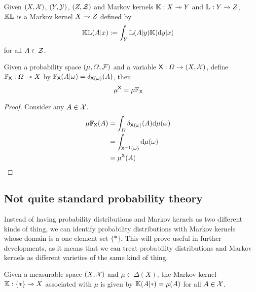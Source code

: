 \begin{definition}
Given $(X,\mathcal{X})$, $(Y,\mathcal{Y})$, $(Z,\mathcal{Z})$ and Markov kernels $\mathbb{K}:X\rightarrowtriangle Y$ and $\mathbb{L}:Y\rightarrowtriangle Z$, $\mathbb{K}\mathbb{L}$ is a Markov kernel $X\rightarrowtriangle Z$ defined by
\begin{align}
	\mathbb{K}\mathbb{L}(A|x):= \int_{Y} \mathbb{L}(A|y)\mathbb{K}(\mathrm{d}y|x)
\end{align}
for all $A\in \mathcal{Z}$.
\end{definition}

\begin{lemma}\label{lem:pushf_kprod}
Given a probability space $(\mu,\Omega,\mathcal{F})$ and a variable $\mathsf{X}:\Omega\to (X,\mathcal{X})$, define $\mathbb{F}_{\mathsf{X}}:\Omega\rightarrowtriangle X$ by $\mathbb{F}_{\mathsf{X}}(A|\omega)=\delta_{\mathsf{X}(\omega)}(A)$, then
\begin{align}
	\mu^{\mathsf{X}} = \mu\mathbb{F}_{\mathsf{X}}
\end{align}
\end{lemma}

\begin{proof}
Consider any $A\in \mathcal{X}$.
\begin{align}
	\mu \mathbb{F}_{\mathsf{X}}(A) &= \int_\Omega \delta_{\mathsf{X}(\omega)}(A) \mathrm{d}\mu(\omega)\\
	&= \int_{\mathsf{X}^{-1}(\omega)} \mathrm{d}\mu(\omega)\\
	&= \mu^{\mathsf{X}}(A)
\end{align}
\end{proof}

\subsection{Not quite standard probability theory}

Instead of having probability distributions and Markov kernels as two different kinds of thing, we can identify probability distributions with Markov kernels whose domain is a one element set $\{*\}$. This will prove useful in further developments, as it means that we can treat probability distributions and Markov kernels as different varieties of the same kind of thing.

\begin{definition}
Given a measurable space $(X,\mathcal{X})$ and $\mu\in \Delta(X)$, the Markov kernel $\mathbb{K}:\{*\}\rightarrowtriangle X$ associated with $\mu$ is given by $\mathbb{K}(A|*)=\mu(A)$ for all $A\in \mathcal{X}$.
\end{definition}

